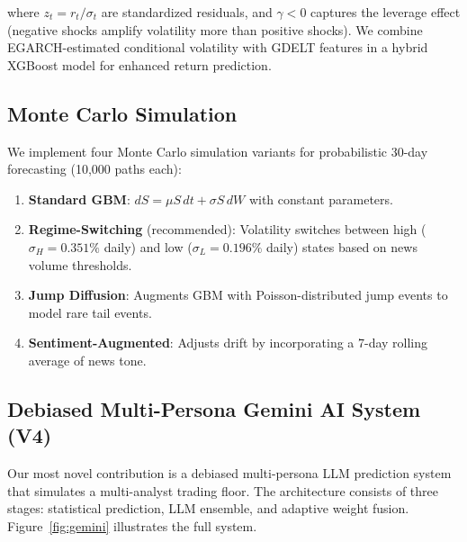 \documentclass[11pt]{article}
\begin{document}
where $z_t = r_t / \sigma_t$ are standardized residuals, and $\gamma < 0$ captures the leverage effect (negative shocks amplify volatility more than positive shocks). We combine EGARCH-estimated conditional volatility with GDELT features in a hybrid XGBoost model for enhanced return prediction.

\subsection{Monte Carlo Simulation}

We implement four Monte Carlo simulation variants for probabilistic 30-day forecasting (10,000 paths each):

\begin{enumerate}
    \item \textbf{Standard GBM}: $dS = \mu S \, dt + \sigma S \, dW$ with constant parameters.
    
    \item \textbf{Regime-Switching} (recommended): Volatility switches between high ($\sigma_H = 0.351\%$ daily) and low ($\sigma_L = 0.196\%$ daily) states based on news volume thresholds.
    
    \item \textbf{Jump Diffusion}: Augments GBM with Poisson-distributed jump events to model rare tail events.
    
    \item \textbf{Sentiment-Augmented}: Adjusts drift by incorporating a 7-day rolling average of news tone.
\end{enumerate}

\subsection{Debiased Multi-Persona Gemini AI System (V4)}

Our most novel contribution is a debiased multi-persona LLM prediction system that simulates a multi-analyst trading floor. The architecture consists of three stages: statistical prediction, LLM ensemble, and adaptive weight fusion. Figure~\ref{fig:gemini} illustrates the full system.
\end{document}
